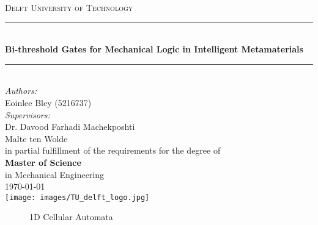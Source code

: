 \documentclass[a4paper]{article}
\begin{document}
\begin{titlepage}

\newcommand{\HRule}{\rule{\linewidth}{0.5mm}} 							%
\center 
 
\textsc{\LARGE Delft University of Technology}\\[1cm]

\HRule \\[0.8cm]
{ \huge \bfseries Bi-threshold Gates for Mechanical Logic in Intelligent Metamaterials }\\[0.7cm]								%
\HRule \\[2cm]
\large
\emph{Authors:}\\
Eoinlee Bley (5216737)\\[1.5cm]	
\emph{Supervisors:}\\
Dr. Davood Farhadi Machekposhti\\
Malte ten Wolde\\[0.5cm]
in partial fulfillment of the requirements for the degree of \\[0.5cm]
\textbf{Master of Science}\\
in Mechanical Engineering\\[0.5cm]
{\large \today}\\[5cm]
\texttt{[image: images/TU\_delft\_logo.jpg]}\\[1cm] 	%
\vfill 
\end{titlepage}

\begin{abstract}

\end{abstract}

\tableofcontents




\newpage

\begin{figure}
    \centering
    
    \caption{1D Cellular Automata}
    \label{fig:1DCA}
\end{figure}



\end{document}
